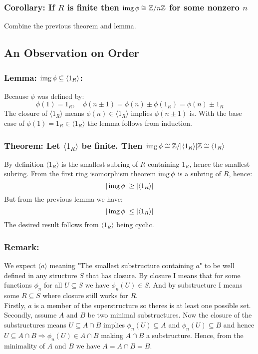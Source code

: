 \subsubsection{Corollary: If $R$ is finite then $\operatorname{img}\phi\cong\mathbb{Z}/n\mathbb{Z}$ for some nonzero $n$}
Combine the previous theorem and lemma.

\subsection{An Observation on Order}
\subsubsection{Lemma: $\operatorname{img}\phi \subseteq \langle 1_R \rangle$:}
Because $\phi$ was defined by:
\[\phi(1)=1_R,\quad \phi(n\pm 1) = \phi(n)\pm \phi(1_R)= \phi(n)\pm 1_R\]
The closure of $\langle 1_R \rangle$ means $\phi(n)\in\langle 1_R \rangle$ implies $\phi(n\pm 1)$ is.
With the base case of $\phi(1) = 1_R \in \langle 1_R \rangle$ the lemma follows from induction.

\subsubsection{Theorem: Let $\langle 1_R\rangle$ be finite. Then $\operatorname{img}\phi\cong\mathbb{Z}/|\langle 1_R\rangle|\mathbb{Z}\cong\langle 1_R\rangle$}
By definition $\langle 1_R \rangle$ is the smallest subring of $R$ containing $1_R$,
hence the smallest subring.
From the first ring isomorphism theorem $\operatorname{img}\phi$ is a subring of $R$,
hence:
\[|\operatorname{img}\phi| \geq |\langle 1_R \rangle|\]
But from the previous lemma we have:
\[|\operatorname{img}\phi| \leq |\langle 1_R \rangle|\]
The desired result follows from $\langle 1_R \rangle$ being cyclic.

\subsubsection{Remark:}
We expect $\langle a \rangle$ meaning "The smallest substructure containing $a$" to be well defined in any structure $S$ that has closure.
By closure I means that for some functions $\phi_n$ for all $U\subseteq S$ we have $\phi_n(U)\in S$.
And by substructure I means some $R\subseteq S$ where closure still works for $R$.
\\

Firstly, $a$ is a member of the superstructure so theres is at least one possible set.
Secondly, assume $A$ and $B$ be two minimal substructures.
Now the closure of the substructures means $U\subseteq A\cap B$ implies $\phi_n(U) \subseteq A$ and $\phi_n(U) \subseteq B$ and hence $U\subseteq A\cap B \Rightarrow \phi_n(U) \in A\cap B$ making $A\cap B$ a substructure.
Hence, from the minimality of $A$ and $B$ we have $A = A\cap B = B$.
\\

